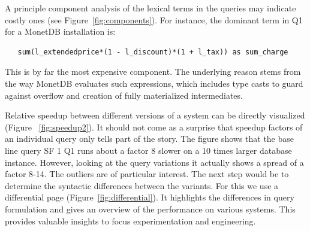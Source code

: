 \documentclass{cidr-2019}
\begin{document}
A principle
component analysis of the lexical terms in the queries may indicate
costly ones (see Figure~\ref{fig:components}). For instance, the
dominant term in Q1
for a MonetDB installation is:
\begin{verbatim}
   sum(l_extendedprice*(1 - l_discount)*(1 + l_tax)) as sum_charge
\end{verbatim}
This is by far the most expensive component. The underlying reason
stems from the way MonetDB evaluates such expressions, which includes
type casts to guard against overflow and creation of fully
materialized intermediates.

Relative speedup between different versions of a system can be
directly visualized (Figure ~\ref{fig:speedup2}). It should not come
as a surprise that speedup factors of an individual query only tells
part of the story. The figure shows that the base line query SF 1
Q1  runs about a factor 8
slower on a 10 times larger database instance.  However, looking at
the query variations it actually shows a spread of a factor 8-14. The
outliers are of particular interest. The next step would be to
determine the syntactic differences between the variants. For this we
use a differential page (Figure~\ref{fig:differential}). It highlights
the differences in query formulation and gives an overview of the
performance on various systems. This provides valuable insights to
focus experimentation and engineering.

\end{document}
